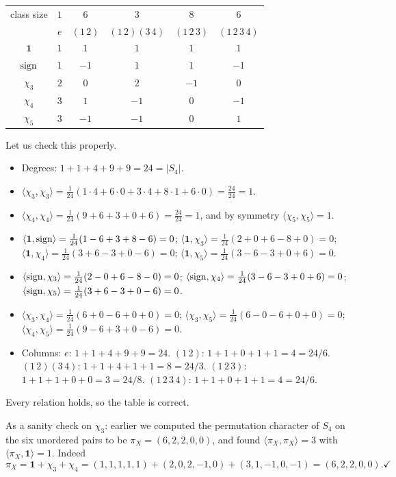 \documentclass[a4paper]{scrartcl}
\newcommand{\ip}[2]{\langle #1, #2 \rangle}
\begin{document}
\begin{center}
\renewcommand{\arraystretch}{1.3}
\setlength{\tabcolsep}{10pt}
\begin{tabular}{c|ccccc}
\toprule
class size & $1$ & $6$ & $3$ & $8$ & $6$\\
 & $e$ & $(1\,2)$ & $(1\,2)(3\,4)$ & $(1\,2\,3)$ & $(1\,2\,3\,4)$\\
\midrule
$\mathbf 1$ & $1$ & $1$ & $1$ & $1$ & $1$\\
$\operatorname{sign}$ & $1$ & $-1$ & $1$ & $1$ & $-1$\\
$\chi_3$ & $2$ & $0$ & $2$ & $-1$ & $0$\\
$\chi_4$ & $3$ & $1$ & $-1$ & $0$ & $-1$\\
$\chi_5$ & $3$ & $-1$ & $-1$ & $0$ & $1$\\
\bottomrule
\end{tabular}
\end{center}

Let us check this properly.
\begin{itemize}
	\item Degrees: $1+1+4+9+9 = 24 = |S_4|$.
	\item $\ip{\chi_3}{\chi_3} = \frac1{24}(1\cdot4 + 6\cdot 0 + 3\cdot 4 + 8\cdot 1 + 6\cdot 0) = \frac{24}{24}=1$.
	\item $\ip{\chi_4}{\chi_4} = \frac1{24}(9 + 6 + 3 + 0 + 6) = \frac{24}{24}=1$, and by symmetry $\ip{\chi_5}{\chi_5} = 1$.
	\item $\ip{\mathbf1}{\sign} = \frac1{24}(1 - 6 + 3 + 8 - 6) = 0$; \; $\ip{\mathbf1}{\chi_3} = \frac1{24}(2 + 0 + 6 - 8 + 0) = 0$; \; $\ip{\mathbf1}{\chi_4} = \frac1{24}(3 + 6 - 3 + 0 - 6) = 0$; \; $\ip{\mathbf1}{\chi_5} = \frac1{24}(3-6-3+0+6) = 0$.
	\item $\ip{\sign}{\chi_3} = \frac1{24}(2 - 0 + 6 - 8 - 0) = 0$; \; $\ip{\sign}{\chi_4} = \frac1{24}(3 - 6 - 3 + 0 + 6) = 0$; \; $\ip{\sign}{\chi_5} = \frac1{24}(3 + 6 - 3 + 0 - 6) = 0$.
	\item $\ip{\chi_3}{\chi_4} = \frac1{24}(6 + 0 - 6 + 0 + 0) = 0$; \; $\ip{\chi_3}{\chi_5} = \frac1{24}(6 - 0 - 6 + 0 + 0) = 0$; \; $\ip{\chi_4}{\chi_5} = \frac1{24}(9 - 6 + 3 + 0 - 6) = 0$.
	\item Columns: $e$: $1+1+4+9+9 = 24$. \;$(1\,2)$: $1+1+0+1+1 = 4 = 24/6$. \;$(1\,2)(3\,4)$: $1+1+4+1+1 = 8 = 24/3$. \;$(1\,2\,3)$: $1+1+1+0+0 = 3 = 24/8$. \;$(1\,2\,3\,4)$: $1+1+0+1+1 = 4 = 24/6$.
\end{itemize}
Every relation holds, so the table is correct.

\begin{remark}
	As a sanity check on $\chi_3$: earlier we computed the permutation character of $S_4$ on the six unordered pairs to be $\pi_X = (6,2,2,0,0)$, and found $\ip{\pi_X}{\pi_X}=3$ with $\ip{\pi_X}{\mathbf 1}=1$. Indeed
	$$\pi_X = \mathbf 1 + \chi_3 + \chi_4 = (1,1,1,1,1)+(2,0,2,-1,0)+(3,1,-1,0,-1) = (6,2,2,0,0). \checkmark$$
\end{remark}
\end{document}
